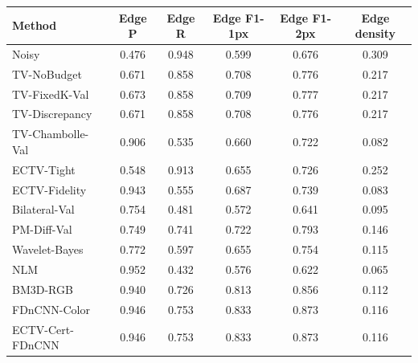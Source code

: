 \begin{tabular}{lccccc}
\toprule
Method & Edge P & Edge R & Edge F1-1px & Edge F1-2px & Edge density \\
\midrule
Noisy & 0.476 & 0.948 & 0.599 & 0.676 & 0.309 \\
TV-NoBudget & 0.671 & 0.858 & 0.708 & 0.776 & 0.217 \\
TV-FixedK-Val & 0.673 & 0.858 & 0.709 & 0.777 & 0.217 \\
TV-Discrepancy & 0.671 & 0.858 & 0.708 & 0.776 & 0.217 \\
TV-Chambolle-Val & 0.906 & 0.535 & 0.660 & 0.722 & 0.082 \\
ECTV-Tight & 0.548 & 0.913 & 0.655 & 0.726 & 0.252 \\
ECTV-Fidelity & 0.943 & 0.555 & 0.687 & 0.739 & 0.083 \\
Bilateral-Val & 0.754 & 0.481 & 0.572 & 0.641 & 0.095 \\
PM-Diff-Val & 0.749 & 0.741 & 0.722 & 0.793 & 0.146 \\
Wavelet-Bayes & 0.772 & 0.597 & 0.655 & 0.754 & 0.115 \\
NLM & 0.952 & 0.432 & 0.576 & 0.622 & 0.065 \\
BM3D-RGB & 0.940 & 0.726 & 0.813 & 0.856 & 0.112 \\
FDnCNN-Color & 0.946 & 0.753 & 0.833 & 0.873 & 0.116 \\
ECTV-Cert-FDnCNN & 0.946 & 0.753 & 0.833 & 0.873 & 0.116 \\
\bottomrule
\end{tabular}
